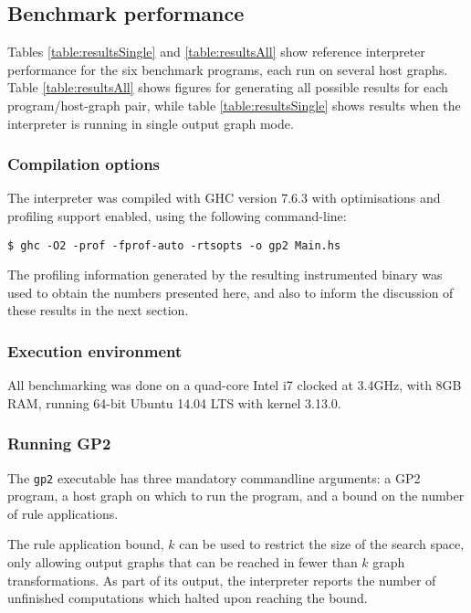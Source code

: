 \subsection{Benchmark performance}


Tables \ref{table:resultsSingle} and \ref{table:resultsAll} show reference interpreter performance for the six benchmark programs, each run on several host graphs. Table \ref{table:resultsAll} shows figures for generating all possible results for each program/host-graph pair, while table \ref{table:resultsSingle} shows results when the interpreter is running in single output graph mode.

\subsubsection*{Compilation options}

The interpreter was compiled with GHC version 7.6.3 with optimisations and profiling support enabled, using the following command-line:

\begin{verbatim}
$ ghc -O2 -prof -fprof-auto -rtsopts -o gp2 Main.hs
\end{verbatim}

The profiling information generated by the resulting instrumented binary was used to obtain the numbers presented here, and also to inform the discussion of these results in the next section.

\subsubsection*{Execution environment}

All benchmarking was done on a quad-core Intel i7 clocked at 3.4GHz, with 8GB RAM, running 64-bit Ubuntu 14.04 LTS with kernel 3.13.0.

\subsubsection*{Running GP2}

The \texttt{gp2} executable has three mandatory commandline arguments: a GP2 program, a host graph on which to run the program, and a bound on the number of rule applications.

The rule application bound, $k$ can be used to restrict the size of the search space, only allowing output graphs that can be reached in fewer than $k$ graph transformations. As part of its output, the interpreter reports the number of unfinished computations which halted upon reaching the bound.





